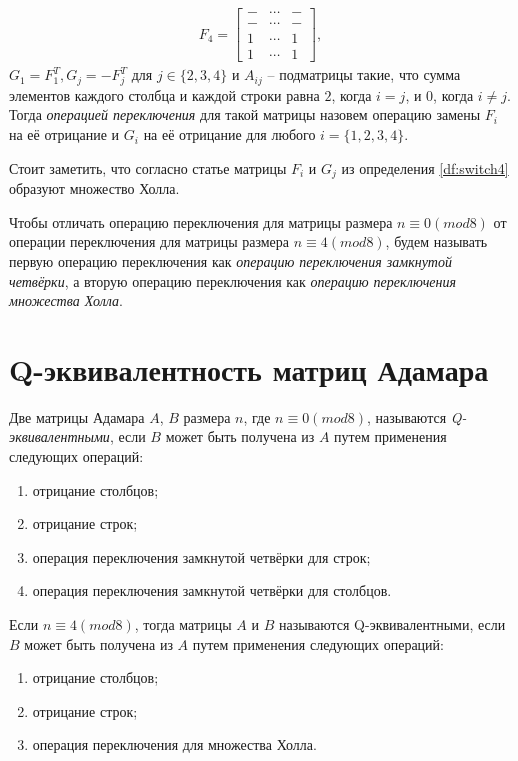 \begin{Df}
\begin{gather*}
        F_4 =
        \begin{bmatrix}
            - & \cdots & - \\
            - & \cdots & - \\
            1 & \cdots & 1 \\
            1 & \cdots & 1
        \end{bmatrix},
    \end{gather*}
    $G_1 = F_1^T, G_j = -F_j^T$ для $j \in \{2, 3, 4\}$ и $A_{ij}$ -- подматрицы такие, что сумма элементов каждого столбца и каждой строки равна $2$, когда $i=j$, и $0$, когда $i \neq j$. Тогда {\it операцией переключения} для такой матрицы назовем операцию замены $F_i$ на её отрицание и $G_i$ на её отрицание для любого $i = \{1, 2, 3, 4\}$.
\end{Df}

Стоит заметить, что согласно статье \cite{kimura:hs} матрицы $F_i$ и $G_j$ из определения \ref{df:switch4} образуют множество Холла.

Чтобы отличать операцию переключения для матрицы размера $n \equiv 0(mod8)$ от операции переключения для матрицы размера $n \equiv 4(mod8)$, будем называть первую операцию переключения как {\it операцию переключения замкнутой четвёрки}, а вторую операцию переключения как {\it операцию переключения множества Холла}.

\section{Q-эквивалентность матриц Адамара}

\begin{Df}[Q-эквивалентность]\normalfont\label{df:q_eq_df}
    Две матрицы Адамара $A$, $B$ размера $n$, где $n \equiv 0(mod8)$, называются {\it Q-эквивалентными}, если $B$ может быть получена из $A$ путем применения следующих операций:
    \begin{enumerate}
        \item отрицание столбцов;
        \item отрицание строк;
        \item операция переключения замкнутой четвёрки для строк;
        \item операция переключения замкнутой четвёрки для столбцов.
    \end{enumerate}
    Если $n \equiv 4(mod8)$, тогда матрицы $A$ и $B$ называются Q-эквивалентными, если $B$ может быть получена из $A$ путем применения следующих операций:
    \begin{enumerate}
        \item отрицание столбцов;
        \item отрицание строк;
        \item операция переключения для множества Холла.
    \end{enumerate}
\end{Df}

